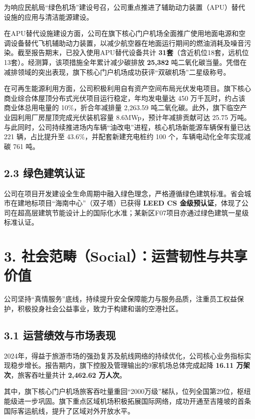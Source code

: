 \documentclass[a4paper,12pt]{article}
\begin{document}
为响应民航局“绿色机场”建设号召，公司重点推进了辅助动力装置（APU）替代设施的应用与清洁能源建设。

在APU替代设施建设方面，公司在旗下核心门户机场全面推广使用地面电源和空调设备替代飞机辅助动力装置，以减少航空器在地面运行期间的燃油消耗及噪音污染。截至报告期末，已投入使用APU替代设备共计 \textbf{31套}（含近机位18套，远机位13套）。经测算，该项措施全年累计减少碳排放 \textbf{25,382} 吨二氧化碳当量。凭借在减排领域的突出表现，旗下核心门户机场成功获评“双碳机场”二星级称号。

在可再生能源利用方面，公司积极利用自有资产空间布局光伏发电项目。旗下核心商业综合体屋顶分布式光伏项目运行稳定，年均发电量达 450 万千瓦时，约占该商业体总用电量的 10\%，折合年减排量 2,263.59 吨二氧化碳。此外，旗下临空产业园利用厂房屋顶完成光伏装机容量 8.6MWp，预计年减排贡献可达 25.75 万吨。与此同时，公司持续推进场内车辆“油改电”进程，核心机场新能源车辆保有量已达 221 辆，占比提升至 43.6\%，并配套新建充电桩约 100 个，车辆电动化全年实现减碳 761 吨。

\subsection{2.3 绿色建筑认证}

公司在项目开发建设全生命周期中融入绿色理念，严格遵循绿色建筑标准。省会城市在建地标项目“海南中心”（双子塔）已获得 \textbf{LEED CS 金级预认证}，体现了公司在超高层建筑节能设计上的国际化水准；某新区F07项目亦通过绿色建筑一星级标准认证。

\section{3. 社会范畴（Social）：运营韧性与共享价值}

公司坚持“真情服务”底线，持续提升安全保障能力与服务品质，注重员工权益保护，积极投身社会公益事业，致力于构建和谐的空港社区。

\subsection{3.1 运营绩效与市场表现}

2024年，得益于旅游市场的强劲复苏及航线网络的持续优化，公司核心业务指标实现稳步增长。报告期内，旗下控股及管理输出的9家机场总体完成起降 \textbf{16.11 万架次}，旅客吞吐量共计 \textbf{2,462.62 万人次}。

其中，旗下核心门户机场旅客吞吐量重回“2000万级”梯队，位列全国第29位，枢纽能级进一步巩固。旗下重点区域机场积极拓展国际网络，成功开通至吉隆坡的首条国际客运航线，提升了区域对外开放水平。
\end{document}
